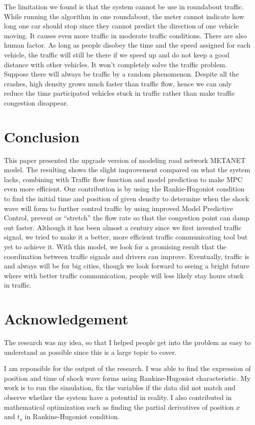 \documentclass{article}
\begin{document}
The limitation we found is that the system cannot be use in roundabout traffic. While running the algorithm in one roundabout, the meter cannot indicate how long one car should stop since they cannot predict the direction of one vehicle moving. It causes even more traffic in moderate traffic conditions. There are also human factor. As long as people disobey the time and the speed assigned for each vehicle, the traffic will still be there if we speed up and do not keep a good distance with other vehicles. It won’t completely solve the traffic problem. Suppose there will always be traffic by a random phenomenon. Despite all the crashes, high density grows much faster than traffic flow, hence we can only reduce the time participated vehicles stuck in traffic rather than make traffic congestion disappear. 
\section*{Conclusion}
This paper presented the upgrade version of modeling road network METANET model. The resulting shows the slight improvement compared on what the system lacks, combining with Traffic flow function and model prediction to make MPC even more efficient. Our contribution is by using the Rankie-Hugoniot condition to find the initial time and position of given density to determine when the shock wave will form to further control traffic by using improved Model Predictive Control, prevent or “stretch” the flow rate so that the congestion point can damp out faster.
Although it has been almost a century since we first invented traffic signal, we tried to make it a better, more efficient traffic communicating tool but yet to achieve it. With this model, we look for a promising result that the coordination between traffic signals and drivers can improve. Eventually, traffic is and always will be for big cities, though we look forward to seeing a bright future where with better traffic communication, people will less likely stay hours stuck in traffic.
\section*{Acknowledgement}
The research was my idea, so that I helped people get into the problem as easy to understand as possible since this is a large topic to cover.

I am reponsible for the output of the research. I was able to find the expression of position and time of shock wave forms using Rankine-Hugoniot characteristic. My work is to run the simulation, fix the variables if the data did not match and observe whether the system have a potential in reality. I also contributed in mathematical optimization such as finding the partial derivatives of position $x$ and $t_{o}$ in Rankine-Hugoniot condition. 
\end{document}
